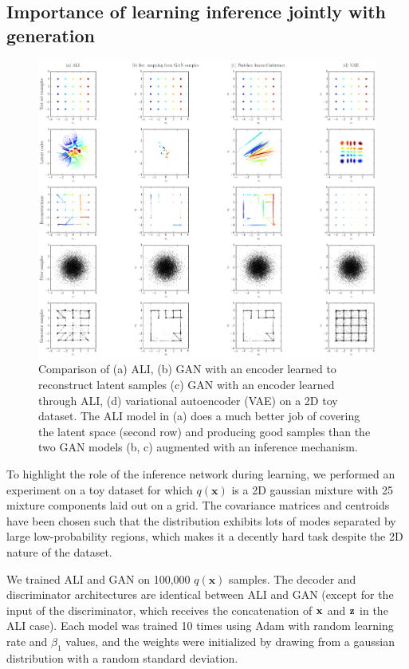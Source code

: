 \documentclass{article}
\begin{document}
\subsection{Importance of learning inference jointly with generation}

\begin{figure}[htb!]
    \centering
    \includegraphics[width=\textwidth]{mixture_plot.png}
    \caption{\label{fig:mixture_plot} Comparison of (a) ALI, (b) GAN with an
    encoder learned to reconstruct latent samples (c) GAN with an encoder
    learned through ALI, (d) variational autoencoder (VAE) on a 2D toy dataset.
    The ALI model in (a) does a much better job of covering the latent space
    (second row) and producing good samples than the two GAN models (b, c)
    augmented with an inference mechanism.}
\end{figure}

To highlight the role of the inference network during learning, we performed an
experiment on a toy dataset for which $q(\bm{x})$ is a 2D gaussian mixture with
25 mixture components laid out on a grid. The covariance matrices and centroids
have been chosen such that the distribution exhibits lots of modes separated by
large low-probability regions, which makes it a decently hard task despite the
2D nature of the dataset.

We trained ALI and GAN on 100,000 $q(\bm{x})$ samples. The decoder and
discriminator architectures are identical between ALI and GAN (except for the
input of the discriminator, which receives the concatenation of $\bf{x}$ and
$\bf{z}$ in the ALI case). Each model was trained 10 times using Adam
\citep{kingma2014adam} with random learning rate and $\beta_1$ values, and the
weights were initialized by drawing from a gaussian distribution with a random
standard deviation.
\end{document}
